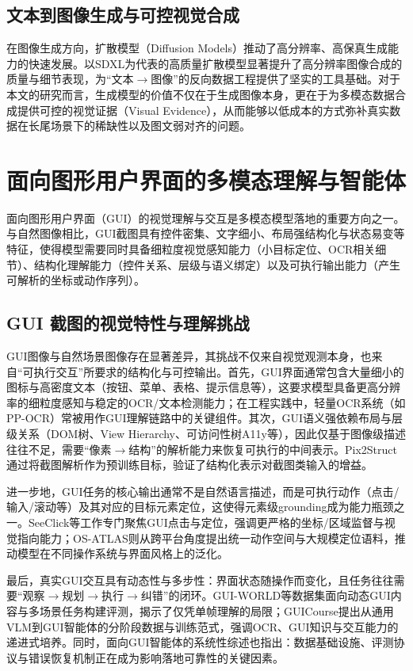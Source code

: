 \subsection{文本到图像生成与可控视觉合成}
在图像生成方向，扩散模型（Diffusion Models）推动了高分辨率、高保真生成能力的快速发展。以SDXL为代表的高质量扩散模型显著提升了高分辨率图像合成的质量与细节表现\citep{podell2023sdxl}，为“文本$\rightarrow$图像”的反向数据工程提供了坚实的工具基础。对于本文的研究而言，生成模型的价值不仅在于生成图像本身，更在于为多模态数据合成提供可控的视觉证据（Visual Evidence），从而能够以低成本的方式弥补真实数据在长尾场景下的稀缺性以及图文弱对齐的问题。

\section{面向图形用户界面的多模态理解与智能体}
面向图形用户界面（GUI）的视觉理解与交互是多模态模型落地的重要方向之一。与自然图像相比，GUI截图具有控件密集、文字细小、布局强结构化与状态易变等特征，使得模型需要同时具备细粒度视觉感知能力（小目标定位、OCR相关细节）、结构化理解能力（控件关系、层级与语义绑定）以及可执行输出能力（产生可解析的坐标或动作序列）。

\subsection{GUI 截图的视觉特性与理解挑战}
GUI图像与自然场景图像存在显著差异，其挑战不仅来自视觉观测本身，也来自“可执行交互”所要求的结构化与可控输出。首先，GUI界面通常包含大量细小的图标与高密度文本（按钮、菜单、表格、提示信息等），这要求模型具备更高分辨率的细粒度感知与稳定的OCR/文本检测能力；在工程实践中，轻量OCR系统（如PP-OCR）常被用作GUI理解链路中的关键组件\citep{du2020ppocr}。其次，GUI语义强依赖布局与层级关系（DOM树、View Hierarchy、可访问性树A11y等），因此仅基于图像级描述往往不足，需要“像素$\rightarrow$结构”的解析能力来恢复可执行的中间表示。Pix2Struct通过将截图解析作为预训练目标，验证了结构化表示对截图类输入的增益\citep{lee2023pix2struct}。

进一步地，GUI任务的核心输出通常不是自然语言描述，而是可执行动作（点击/输入/滚动等）及其对应的目标元素定位，这使得元素级grounding成为能力瓶颈之一。SeeClick等工作专门聚焦GUI点击与定位，强调更严格的坐标/区域监督与视觉指向能力\citep{liu2024seeclick}；OS-ATLAS则从跨平台角度提出统一动作空间与大规模定位语料，推动模型在不同操作系统与界面风格上的泛化\citep{wu2024osatlas}。

最后，真实GUI交互具有动态性与多步性：界面状态随操作而变化，且任务往往需要“观察$\rightarrow$规划$\rightarrow$执行$\rightarrow$纠错”的闭环。GUI-WORLD等数据集面向动态GUI内容与多场景任务构建评测，揭示了仅凭单帧理解的局限\citep{guiworld2024}；GUICourse提出从通用VLM到GUI智能体的分阶段数据与训练范式，强调OCR、GUI知识与交互能力的递进式培养\citep{guicourse2024}。同时，面向GUI智能体的系统性综述也指出：数据基础设施、评测协议与错误恢复机制正在成为影响落地可靠性的关键因素\citep{llmguiaentsurvey2024}。

